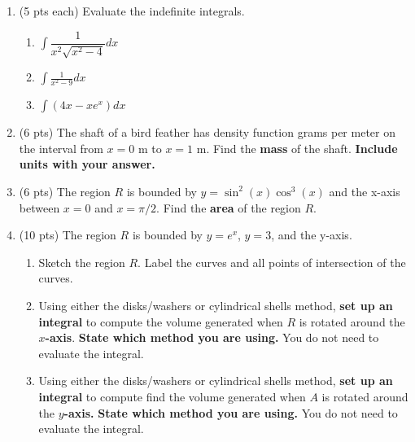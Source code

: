 \documentclass[12pt]{article}
\renewcommand{\emph}[1]{\textsf{\textbf{#1}}}
\begin{document}
\newpage
\begin{enumerate}

\item (5 pts each) Evaluate the indefinite integrals. 
	\begin{enumerate}
	\item $\displaystyle \int \dfrac{1}{x^2\sqrt{x^2-4}} dx $
	\vfill

	\item $\displaystyle \int \frac{1}{x^2-9} dx$
	\vfill
\newpage
	\item $\displaystyle \int (4x-xe^x ) dx$
	\vfill
	\end{enumerate}
\item (6 pts) The shaft of a bird feather has density function  grams per meter on the interval from $x=0$ m to $x=1$ m. Find the \emph{mass} of the shaft. \emph{Include units with your answer.}
\vfill
\newpage
\item (6 pts) The region $R$ is bounded by $ y = \sin^2 (x) \cos^3 (x) $ and the x-axis between $x = 0$ and $ x = \pi/2$.  Find the \textbf{area} of the region $R.$

\vfill



\newpage


\item (10 pts) The region $R$ is bounded by $y= e^x$, $y=3$, and the y-axis.
\begin{enumerate}
\item Sketch the region $R.$ Label the curves and all points of intersection of the curves.
\vfill
\item Using either the disks/washers or cylindrical shells method, \emph{set up an integral} to compute the volume generated when $R$ is rotated around the \textbf{$x$-axis}. \emph{State which method you are using.} You do not need to evaluate the integral.
\vfill
\item Using either the disks/washers or cylindrical shells method, \emph{set up an integral} to compute find the volume generated when $A$ is rotated around the \textbf{$y$-axis.} \emph{State which method you are using.} You do not need to evaluate the integral.
\vfill
\end{enumerate}



\end{enumerate}
\end{document}
